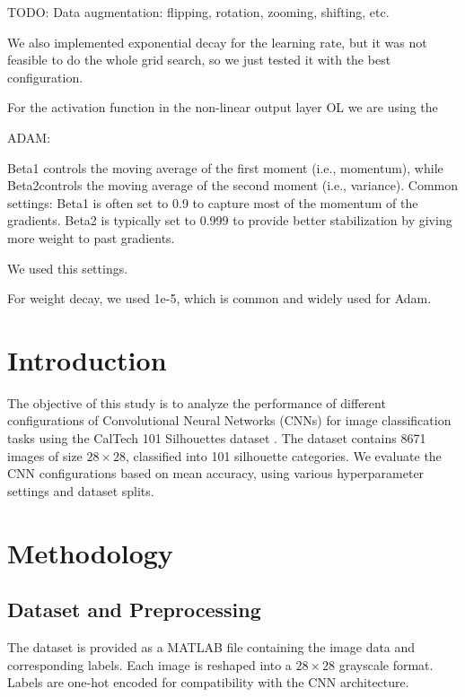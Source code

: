 \documentclass[11pt]{article}
\begin{document}
TODO: Data augmentation: flipping, rotation, zooming, shifting, etc.

We also implemented exponential decay for the learning rate, but it was not feasible to do the whole grid search, so we just tested it with the best configuration.


For the activation function in the non-linear output layer OL we are using the 

ADAM: 

Beta1 controls the moving average of the first moment (i.e., momentum), while Beta2controls the moving average of the second moment (i.e., variance).
Common settings:
Beta1 is often set to 0.9 to capture most of the momentum of the gradients.
Beta2 is typically set to 0.999 to provide better stabilization by giving more weight to past gradients.

We used this settings. 

For weight decay, we used 1e-5,  which is common and widely used for Adam.


\section{Introduction}
The objective of this study is to analyze the performance of different configurations of Convolutional Neural Networks (CNNs) for image classification tasks using the CalTech 101 Silhouettes dataset \cite{dataset}. The dataset contains 8671 images of size $28 \times 28$, classified into 101 silhouette categories. We evaluate the CNN configurations based on mean accuracy, using various hyperparameter settings and dataset splits.

\section{Methodology}

\subsection{Dataset and Preprocessing}
The dataset \cite{dataset} is provided as a MATLAB file containing the image data and corresponding labels. Each image is reshaped into a $28 \times 28$ grayscale format. Labels are one-hot encoded for compatibility with the CNN architecture.
\end{document}
